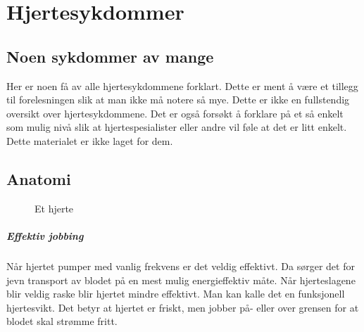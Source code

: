 	\chapter{Hjertesykdommer\\[0.5in]}
		
		\section{Noen sykdommer av mange}	
			Her er noen få av alle hjertesykdommene forklart. Dette er ment å være et tillegg til forelesningen slik at man ikke må notere så mye. Dette er ikke en fullstendig oversikt over hjertesykdommene. Det er også forsøkt å forklare på et så enkelt som mulig nivå slik at hjertespesialister eller andre vil føle at det er litt enkelt. Dette materialet er ikke laget for dem.\\
		\section{Anatomi}
					\begin{figure}[ht]
                      \centering
                      \caption{Et hjerte}
                    \end{figure}    


			\paragraph{Effektiv jobbing\\}
				Når hjertet pumper med vanlig frekvens er det veldig effektivt. Da sørger det for jevn transport av blodet på en mest mulig energieffektiv måte. Når hjerteslagene blir veldig raske blir hjertet mindre effektivt\cite{FA-saladin}. Man kan kalle det en funksjonell hjertesvikt. Det betyr at hjertet er friskt, men jobber på- eller over grensen for at blodet skal strømme fritt.
